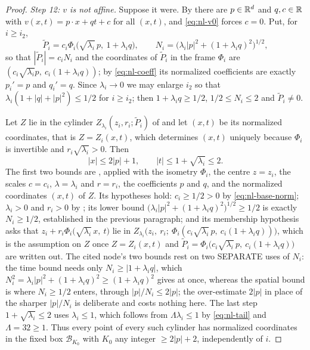 \begin{proof}
\emph{Step 12: $v$ is not affine.}
Suppose it were. By  there are $p\in\mathbb{R}^d$ and
$q,c\in\mathbb{R}$ with $v(x,t)=p\cdot x+qt+c$ for all $(x,t)$, and
\eqref{eq:nl-v0} forces $c=0$. Put, for $i\ge i_2$,
\[
  \widetilde P_i=c_i\Phi_i\bigl(\sqrt{\lambda_i}\,p,\ 1+\lambda_iq\bigr),
  \qquad N_i=\bigl(\lambda_i|p|^2+(1+\lambda_iq)^2\bigr)^{1/2},
\]
so that $|\widetilde P_i|=c_iN_i$ and the coordinates of $\widetilde P_i$ in the
frame $\Phi_i$ are $(c_i\sqrt{\lambda_i}p,\ c_i(1+\lambda_iq))$; by
\eqref{eq:nl-coeff} its normalized coefficients are exactly $p_i'=p$ and
$q_i'=q$. Since $\lambda_i\to0$ we may enlarge $i_2$ so that
$\lambda_i(1+|q|+|p|^2)\le1/2$ for $i\ge i_2$; then $1+\lambda_iq\ge1/2$,
$1/2\le N_i\le2$ and $\widetilde P_i\ne0$.

Let $Z$ lie in the cylinder $Z_{\lambda_i}(z_i,r_i;\widetilde P_i)$ of
 and let $(x,t)$ be its normalized coordinates, that is
$Z=Z_i(x,t)$, which determines $(x,t)$ uniquely because $\Phi_i$ is invertible
and $r_i\sqrt{\lambda_i}>0$. Then
\[
  |x|\le2|p|+1,\qquad |t|\le1+\sqrt{\lambda_i}\le2 .
\]
The first two bounds are , applied with the
isometry $\Phi_i$, the centre $z=z_i$, the scales $c=c_i$, $\lambda=\lambda_i$ and
$r=r_i$, the coefficients $p$ and $q$, and the normalized coordinates $(x,t)$ of
$Z$. Its hypotheses hold: $c_i\ge1/2>0$ by \eqref{eq:nl-base-norm}; $\lambda_i>0$
and $r_i>0$ by ; its lower bound
$\bigl(\lambda_i|p|^2+(1+\lambda_iq)^2\bigr)^{1/2}\ge1/2$ is exactly $N_i\ge1/2$,
established in the previous paragraph; and its membership hypothesis asks that
$z_i+r_i\Phi_i\bigl(\sqrt{\lambda_i}\,x,\ t\bigr)$ lie in
$Z_{\lambda_i}\bigl(z_i,\ r_i;\ \Phi_i(c_i\sqrt{\lambda_i}\,p,\
c_i(1+\lambda_iq))\bigr)$, which is the assumption on $Z$ once $Z=Z_i(x,t)$ and
$\widetilde P_i=\Phi_i\bigl(c_i\sqrt{\lambda_i}\,p,\ c_i(1+\lambda_iq)\bigr)$ are
written out. The cited node's two bounds rest on two SEPARATE uses of $N_i$: the
time bound needs only $N_i\ge|1+\lambda_iq|$, which
$N_i^2=\lambda_i|p|^2+(1+\lambda_iq)^2\ge(1+\lambda_iq)^2$ gives at once, whereas
the spatial bound is where $N_i\ge1/2$ enters, through $|p|/N_i\le2|p|$; the
over-estimate $2|p|$ in place of the sharper $|p|/N_i$ is deliberate and costs
nothing here. The last step $1+\sqrt{\lambda_i}\le2$ uses $\lambda_i\le1$, which
follows from $\Lambda\lambda_i\le1$ by \eqref{eq:nl-tail} and $\Lambda=32\ge1$.
Thus every point of every such cylinder has normalized coordinates in the fixed
box $\mathcal B_{K_0}$ with $K_0$ any integer $\ge2|p|+2$, independently of $i$.


\end{proof}
